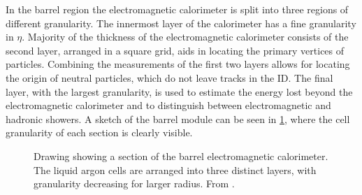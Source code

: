 In the barrel region the electromagnetic calorimeter is split into three regions of different granularity. The innermost layer of the calorimeter has a fine granularity in $\eta$. Majority of the thickness of the electromagnetic calorimeter consists of the second layer, arranged in a square grid, aids in locating the primary vertices of particles. Combining the measurements of the first two layers allows for locating the origin of neutral particles, which do not leave tracks in the ID. The final layer, with the largest granularity, is used to estimate the energy lost beyond the electromagnetic calorimeter and to distinguish between electromagnetic and hadronic showers. A sketch of the barrel module can be seen in \cref{fig:method:ATLAS:ECal}, where the cell granularity of each section is clearly visible.
\begin{figure}
    \centering
    \caption[Drawing showing a section of the barrel electromagnetic calorimeter]{Drawing showing a section of the barrel electromagnetic calorimeter.
    The liquid argon cells are arranged into three distinct layers, with granularity decreasing for larger radius.
    From \cite{ATLAS}.}
    \label{fig:method:ATLAS:ECal}
\end{figure}

